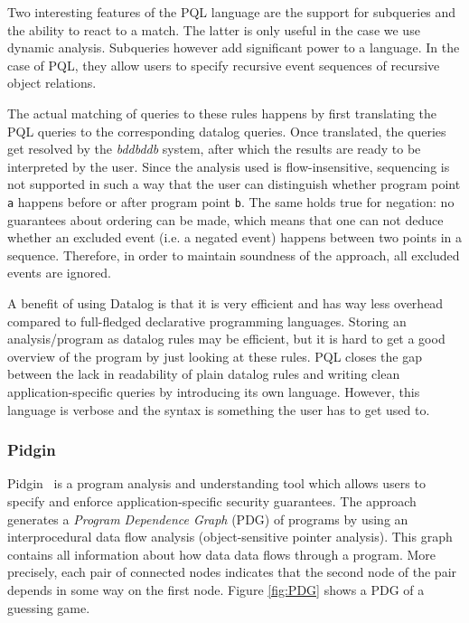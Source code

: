 Two interesting features of the PQL language are the support for subqueries and the ability to react to a match. The latter is only useful in the case we use dynamic analysis. Subqueries however add significant power to a language. In the case of PQL, they allow users to specify recursive event sequences of recursive object relations.

The actual matching of queries to these rules happens by first translating the PQL queries to the corresponding datalog queries. Once translated, the queries get resolved by the \textit{bddbddb} system, after which the results are ready to be interpreted by the user. Since the analysis used is flow-insensitive, sequencing is not supported in such a way that the user can distinguish whether program point \texttt{a} happens before or after program point \texttt{b}. The same holds true for negation: no guarantees about ordering can be made, which means that one can not deduce whether an excluded event (i.e. a negated event) happens between two points in a sequence. Therefore, in order to maintain soundness of the approach, all excluded events are ignored.

A benefit of using Datalog is that it is very efficient and has way less overhead compared to full-fledged declarative programming languages. Storing an analysis/program as datalog rules may be efficient, but it is hard to get a good overview of the program by just looking at these rules. PQL closes the gap between the lack in readability of plain datalog rules and writing clean application-specific queries by introducing its own language. However, this language is verbose and the syntax is something the user has to get used to.

\subsubsection*{Pidgin}

Pidgin~\cite{PidginQL} is a program analysis and understanding tool which allows users to specify and enforce application-specific security guarantees. The approach generates a \textit{Program Dependence Graph} (PDG) of programs by using an interprocedural data flow analysis (object-sensitive pointer analysis). This graph contains all information about how data data flows through a program. More precisely, each pair of connected nodes indicates that the second node of the pair depends in some way on the first node. Figure \ref{fig:PDG} shows a PDG of a guessing game.

